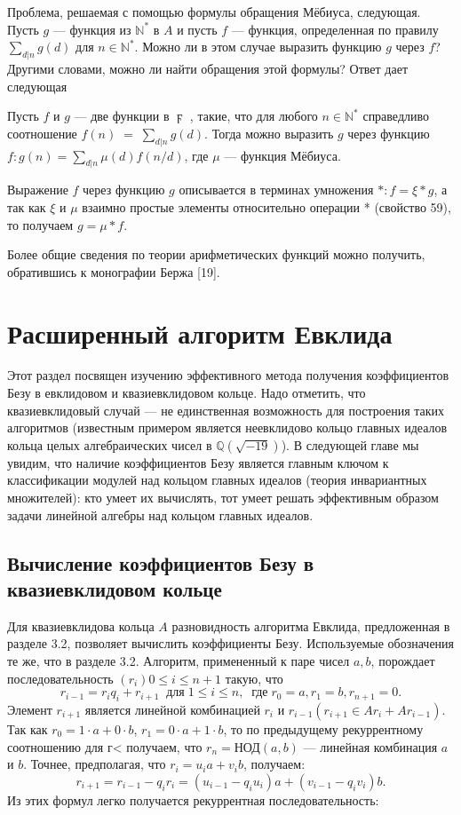 \documentclass{mai_book}
\begin{document}
Проблема, решаемая с помощью формулы обращения Мёбиуса, следующая. Пусть $g$ — функция из $\mathbb{N}^*$ в $A$ и пусть $f$ — функция, определенная по правилу $\sum\nolimits_{d|n}g(d)$ для $n\in\mathbb{N}^*$. Можно ли в этом случае выразить функцию $g$ через $f$? Другими словами, можно ли найти обращения этой формулы? Ответ дает следующая
\begin{thm}
\hspace{0.5cm}Пусть $f$ и $g$ — две функции в $\digamma$ , такие, что для любого $n\in\mathbb{N}^*$ справедливо соотношение $f(n)\;=\;\sum\nolimits_{d|n}g(d)$. Тогда можно выразить $g$
через функцию $f: g(n)=\sum\nolimits_{d|n}\mu(d)f(n/d)$, где $\mu$ — функция Мёбиуса.
\end{thm}
\newpage
\begin{myproof}
Выражение $f$ через функцию $g$ описывается в терминах умножения
$*: f = \xi*g$, а так как $\xi$ и $\mu$ взаимно простые элементы относительно
 операции * (свойство 59), то получаем $g= \mu*f$.
\end{myproof}

Более общие сведения по теории арифметических функций можно
получить, обратившись к монографии Бержа [19].
\section{Расширенный алгоритм Евклида}
\noindent Этот раздел посвящен изучению эффективного метода получения ко­эффициентов Безу в евклидовом и квазиевклидовом кольце. Надо от­метить, что квазиевклидовый случай — не единственная возможность
для построения таких алгоритмов (известным примером является не­евклидово кольцо главных идеалов кольца целых алгебраических чисел
в $\mathbb{Q}(\sqrt{-19})$). В следующей главе мы увидим, что наличие коэффициен­тов Безу является главным ключом к классификации модулей над кольцом главных идеалов (теория инвариантных множителей): кто умеет их
вычислять, тот умеет решать эффективным образом задачи линейной
алгебры над кольцом главных идеалов.
\subsection{Вычисление коэффициентов Безу
в квазиевклидовом кольце}
\noindent Для квазиевклидова кольца $A$ разновидность алгоритма Евклида, пред­ложенная в разделе 3.2, позволяет вычислить коэффициенты Безу. Ис­пользуемые обозначения те же, что в разделе 3.2. Алгоритм, приме­ненный к паре чисел $a,b$, порождает последовательность $(r_{i}){0\leqslant i\leqslant n+1}$ такую, что
$$r_{i-1}=r_{i}q_{i}+r_{i+1}\;\;\text{для}\;1\leqslant i\leqslant n,\;\;\text{где}\;r_{0}=a,r_{1}=b,r_{n+1}=0.$$
Элемент $r_{i+1}$ является линейной комбинацией $r_{i}$ и $r_{i-1} (r_{i+1}\in Ar_{i}+Ar_{i-1})$. Так как $r_{0}=1\cdot a+0\cdot b$, $r_{1}=0\cdot a+1\cdot b$, то по предыдущему
рекуррентному соотношению для г< получаем, что $r_{n} = \text{НОД}(a,b)$ — линейная комбинация $a$ и $b$. Точнее, предполагая, что $r_{i}=u_{i}a+v_{i}b$, получаем:
$$r_{i+1}=r_{i-1}-q_{i}r_{i}=(u_{i-1}-q_{i}u_{i})a+(v_{i-1}-q_{i}v_{i})b.$$
\newpage
\noindent Из этих формул легко получается рекуррентная последовательность:
\end{document}
